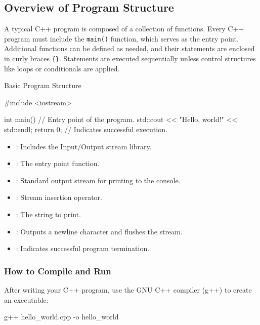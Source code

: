 \subsection{Overview of Program Structure}

A typical C++ program is composed of a collection of functions. Every C++ program must include the \texttt{main()} function, which serves as the entry point. Additional functions can be defined as needed, and their statements are enclosed in curly braces \texttt{\{\}}. Statements are executed sequentially unless control structures like loops or conditionals are applied.

\begin{exampleblock}{Basic Program Structure}
    \begin{codeblock}[language=C++]
#include <iostream>

int main() { // Entry point of the program.
    std::cout << "Hello, world!" << std::endl;
    return 0; // Indicates successful execution.
}
\end{codeblock}

\begin{itemize}
    \item {}: Includes the Input/Output stream library.
    \item {}: The entry point function.
    \item {}: Standard output stream for printing to the console.
    \item \plaintt{<<}: Stream insertion operator.
    \item {}: The string to print.
    \item {}: Outputs a newline character and flushes the stream.
    \item {}: Indicates successful program termination.
\end{itemize}
\end{exampleblock}

\subsubsection{How to Compile and Run}

After writing your C++ program, use the GNU C++ compiler (g++) to create an executable:

\begin{codeblock}[language=bash, numbers=none]
g++ hello_world.cpp -o hello_world
\end{codeblock}

